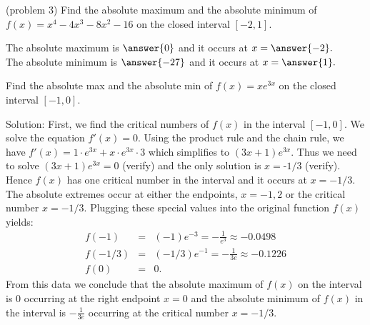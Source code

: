 \documentclass[handout]{ximera}
\begin{document}
\begin{problem}(problem 3)
Find the absolute maximum and the absolute minimum of $f(x) = x^4 - 4x^3 - 8x^2 - 16$  
on the closed interval $[-2, 1]$.

The absolute maximum is $\answer{0}$ and it occurs at $x = \answer{-2}.$
\\
The absolute minimum is $\answer{-27}$ and it occurs at $x = \answer{1}.$
\end{problem}



\begin{example}[example 4]
Find the absolute max and the absolute min of $f(x) = xe^{3x}$ on the closed interval $[-1, 0]$.

Solution:  First, we find the critical numbers of $f(x)$ in the 
interval $[-1, 0]$.   
We solve the equation $f'(x) =0$.  
Using the product rule and the chain rule, we have $f'(x) = 1\cdot e^{3x} + x\cdot e^{3x} \cdot 3$ which simplifies to $(3x+1)e^{3x}$. 
Thus we need to solve $(3x+1)e^{3x} = 0$ (verify) and the only solution is $x=\text{-}1/3$ (verify).
Hence $f(x)$ has one critical number in the interval and it occurs at $x = -1/3$.
The absolute extremes occur at either the endpoints, $x=-1, 2$ or the critical number $x = -1/3$.  
Plugging these special values into the original function $f(x)$ yields:
\begin{eqnarray*}
f(-1) &=& (-1)e^{-3} = -\frac{1}{e^3} \approx -0.0498\\
f(-1/3) &=& (-1/3)e^{-1} = -\frac{1}{3e} \approx -0.1226\\
f(0) &=& 0.
\end{eqnarray*}
From this data we conclude that the absolute maximum of $f(x)$ on the interval is $0$ occurring 
at the right endpoint $x = 0$ and the absolute minimum of $f(x)$ in the interval is $-\frac{1}{3e}$
occurring at the critical number $x = -1/3$.
\begin{image}
\end{image}
\end{example}
\end{document}
